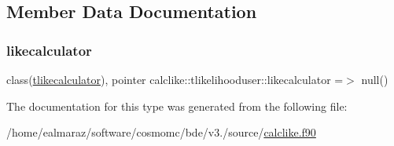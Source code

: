 \subsection{Member Data Documentation}
\mbox{\label{structcalclike_1_1tlikelihooduser_a071410af228e3ca89c05947b5b7d9aec}} 
\subsubsection{\texorpdfstring{likecalculator}{likecalculator}}
{\footnotesize\ttfamily class(\mbox{\hyperlink{structcalclike_1_1tlikecalculator}{tlikecalculator}}), pointer calclike\+::tlikelihooduser\+::likecalculator =$>$ null()\hspace{0.3cm}{\ttfamily [private]}}



The documentation for this type was generated from the following file\+:\begin{DoxyCompactItemize}
\item 
/home/ealmaraz/software/cosmomc/bde/v3./source/\mbox{\hyperlink{calclike_8f90}{calclike.\+f90}}\end{DoxyCompactItemize}
